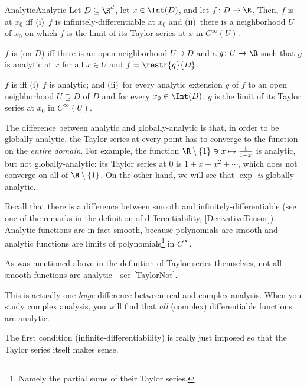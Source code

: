 \begin{dfn}{Analytic}{Analytic}
Let $D\subseteq \R ^d$, let $x\in \Int (D)$, and let $f\colon D\rightarrow \R$.  Then, $f$ is  at $x_0$ iff (i)~$f$ is infinitely-differentiable at $x_0$ and (ii)~there is a neighborhood $U$ of $x_0$ on which $f$ is the limit of its Taylor series at $x$ in $C^\infty (U)$.

$f$ is  (on $D$) iff there is an open neighborhood $U\supseteq D$ and a $g\colon U\rightarrow \R$ such that $g$ is analytic at $x$ for all $x\in U$ and $f=\restr{g}{D}$.

$f$ is  iff (i)~$f$ is analytic; and (ii)~for every analytic extension $g$ of $f$ to an open neighborhood $U\supseteq D$ of $D$ and for every $x_0\in \Int (D)$, $g$ is the limit of its Taylor series at $x_0$ in $C^\infty (U)$.
\begin{rmk}
The difference between analytic and globally-analytic is that, in order to be globally-analytic, the Taylor series at every point has to converge to the function on the \emph{entire domain}.  For example, the function $\R \setminus \{ 1\} \ni x\mapsto \frac{1}{1-x}$ is analytic, but not globally-analytic:  its Taylor series at $0$ is $1+x+x^2+\cdots$, which does not converge on all of $\R \setminus \{ 1\}$.  On the other hand, we will see that $\exp$ \emph{is} globally-analytic.
\end{rmk}
\begin{rmk}
Recall that there is a difference between smooth and infinitely-differentiable (see one of the remarks in the definition of differentiability, \cref{DerivativeTensor}).  Analytic functions are in fact smooth, because polynomials are smooth and analytic functions are limits of polynomials\footnote{Namely the partial sums of their Taylor series.} in $C^\infty$.
\end{rmk}
\begin{rmk}
As was mentioned above in the definition of Taylor series themselves, not all smooth functions are analytic---see \cref{TaylorNot}.
\end{rmk}
\begin{rmk}
This is actually one \emph{huge} difference between real and complex analysis.  When you study complex analysis, you will find that \emph{all} (complex) differentiable functions are analytic.  
\end{rmk}
\begin{rmk}
The first condition (infinite-differentiability) is really just imposed so that the Taylor series itself makes sense.
\end{rmk}
\end{dfn}
